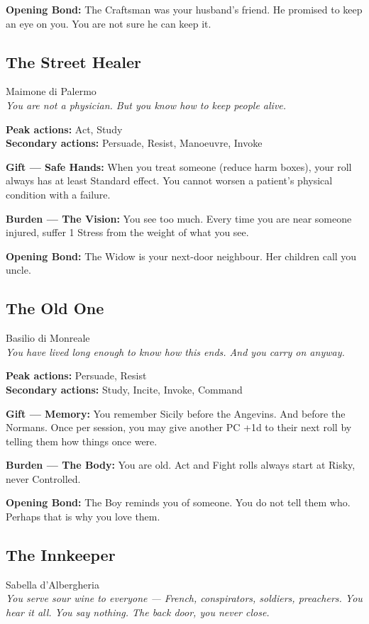 \textbf{Opening Bond:} The Craftsman was your husband's friend.
He promised to keep an eye on you. You are not sure he can keep it.

\filetto

\subsection{The Street Healer}
{\cinzel\footnotesize\color{grigionote} Maimone di Palermo}\\
\textit{You are not a physician. But you know how to keep people alive.}

\textbf{Peak actions:} Act, Study\\
\textbf{Secondary actions:} Persuade, Resist, Manoeuvre, Invoke

\textbf{Gift --- Safe Hands:} When you treat someone (reduce harm
boxes), your roll always has at least Standard effect. You cannot
worsen a patient's physical condition with a failure.

\textbf{Burden --- The Vision:} You see too much. Every time you are
near someone injured, suffer 1 Stress from the weight of what you see.

\textbf{Opening Bond:} The Widow is your next-door neighbour.
Her children call you uncle.

\filetto

\subsection{The Old One}
{\cinzel\footnotesize\color{grigionote} Basilio di Monreale}\\
\textit{You have lived long enough to know how this ends. And you carry on anyway.}

\textbf{Peak actions:} Persuade, Resist\\
\textbf{Secondary actions:} Study, Incite, Invoke, Command

\textbf{Gift --- Memory:} You remember Sicily before the Angevins.
And before the Normans. Once per session, you may give another PC
+1d to their next roll by telling them how things once were.

\textbf{Burden --- The Body:} You are old. Act and Fight rolls always
start at Risky, never Controlled.

\textbf{Opening Bond:} The Boy reminds you of someone.
You do not tell them who. Perhaps that is why you love them.

\filetto

\subsection{The Innkeeper}
{\cinzel\footnotesize\color{grigionote} Sabella d'Albergheria}\\
\textit{You serve sour wine to everyone --- French, conspirators,
soldiers, preachers. You hear it all. You say nothing. The back
door, you never close.}

